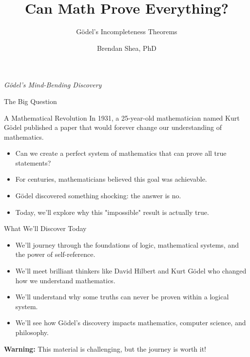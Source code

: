 \documentclass[aspectratio=169]{beamer}
\title{Can Math Prove Everything?}
\subtitle{Gödel's Incompleteness Theorems}
\author{Brendan Shea, PhD}
\institute{Rochester Community and Technical College}
\date{}
\begin{document}
\begin{frame}
\titlepage
\begin{center}
\textit{Gödel's Mind-Bending Discovery}
\end{center}
\end{frame}

\begin{frame}{The Big Question}

\begin{alertblock}{A Mathematical Revolution}
In 1931, a 25-year-old mathematician named Kurt Gödel published a paper that would forever change our understanding of mathematics.
\end{alertblock}

\begin{itemize}
    \item Can we create a perfect system of mathematics that can prove all true statements?
    \item For centuries, mathematicians believed this goal was achievable.
    \item Gödel discovered something shocking: the answer is no.
    \item Today, we'll explore why this "impossible" result is actually true.
\end{itemize}

\end{frame}

\begin{frame}{What We'll Discover Today}

\begin{itemize}
    \item We'll journey through the foundations of logic, mathematical systems, and the power of self-reference.
    \item We'll meet brilliant thinkers like David Hilbert and Kurt Gödel who changed how we understand mathematics.
    \item We'll understand why some truths can never be proven within a logical system.
    \item We'll see how Gödel's discovery impacts mathematics, computer science, and philosophy.
\end{itemize}

\vspace{0.5cm}
\begin{center}
\textbf{Warning:} This material is challenging, but the journey is worth it!
\end{center}

\end{frame}
\end{document}
